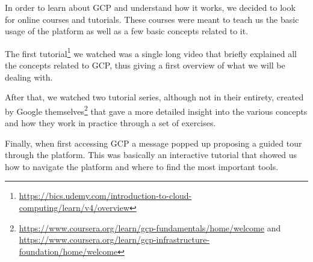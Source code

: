 In order to learn about GCP and understand how it works, we decided to
look for online courses and tutorials. These courses were meant to
teach us the basic usage of the platform as well as a few basic
concepts related to it. 

The first
tutorial\footnote{\url{https://bics.udemy.com/introduction-to-cloud-computing/learn/v4/overview}}
we watched was a single long video that briefly explained all the
concepts related to GCP, thus giving a first overview of what we will
be dealing with.

After that, we watched two tutorial series, although not in their
entirety, created by Google
themselves\footnote{\url{https://www.coursera.org/learn/gcp-fundamentals/home/welcome}
and
\url{https://www.coursera.org/learn/gcp-infrastructure-foundation/home/welcome}}
that gave a more detailed insight into the various concepts and how
they work in practice through a set of exercises.

Finally, when first accessing GCP a message popped up proposing a
guided tour through the platform. This was basically an interactive
tutorial that showed us how to navigate the platform and where to find
the most important tools.

